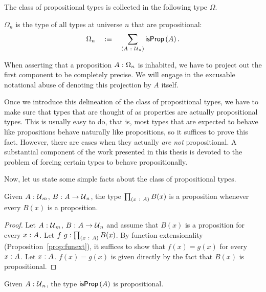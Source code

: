 The class of propositional types is collected in the following type $\Omega$.
\begin{defn}[$\Omega$]\label{defn:omega}
  $\Omega_n$ is the type of all types at universe $n$ that are propositional:
  \begin{equation*}
    \Omega_n \quad:\equiv\quad \sum_{(A~:~\mathcal{U}{}_n)} \mathsf{isProp}\left(A\right).
  \end{equation*}
\end{defn}

When asserting that a proposition $A\hspace{0.1mm}:\hspace{0.1mm}\Omega_n$ is inhabited, we have to project out
the first component to be completely precise. We will engage in the excusable notational
abuse of denoting this projection by $A$ itself.

Once we introduce this delineation of the class of propositional types, we have to make
sure that types that are thought of as properties are actually propositional types. This
is usually easy to do, that is, most types that are expected to behave like propositions
behave naturally like propositions, so it suffices to prove this fact. However, there are
cases when they actually \emph{are not} propositional. A substantial component of the work
presented in this thesis is devoted to the problem of forcing certain types to behave
propositionally.

Now, let us state some simple facts about the class of propositional types.

\begin{prop}\label{prop:pi-prop}
  Given $A\hspace{0.1mm}:\hspace{0.1mm}\mathcal{U}{}_m$, $B\hspace{0.1mm}:\hspace{0.1mm}A \rightarrow \mathcal{U}{}_n$, the type $\prod_{(x~:~A)} B(x)$
  is a proposition whenever every $B(x)$ is a proposition.
\end{prop}
\begin{proof}
  Let $A\hspace{0.1mm}:\hspace{0.1mm}\mathcal{U}{}_m$, $B\hspace{0.1mm}:\hspace{0.1mm}A \rightarrow \mathcal{U}{}_n$ and assume that $B(x)$ is a
  proposition for every $x\hspace{0.1mm}:\hspace{0.1mm}A$. Let $f~g:\prod_{(x~:~A)} B(x)$. By
  function extensionality (Proposition~\ref{prop:funext}), it suffices to show that $f(x)
  = g(x)$ for every $x\hspace{0.1mm}:\hspace{0.1mm}A$. Let $x\hspace{0.1mm}:\hspace{0.1mm}A$. $f(x) = g(x)$ is given directly by
  the fact that $B(x)$ is propositional.
\end{proof}

\begin{prop}
  Given $A\hspace{0.1mm}:\hspace{0.1mm}\mathcal{U}{}_n$, the type $\mathsf{isProp}\left(A\right)$ is propositional.
\end{prop}

